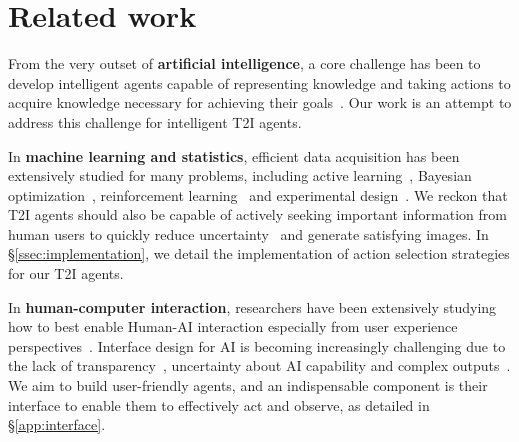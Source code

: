 \section{Related work}
\label{sec:related}

From the very outset of \textbf{artificial intelligence}, a core challenge has been to develop intelligent agents capable of representing knowledge and taking actions to acquire knowledge necessary for achieving their goals~\citep{McCHay69, minsky1974framework, moore1985formal, nilsson2009quest, russell2016artificial}. Our work is an attempt to address this challenge for intelligent T2I agents.%

In \textbf{machine learning and statistics}, efficient data acquisition has been extensively studied for many problems, including active learning~\citep{cohn1996active, settles.tr09, houlsby2011bayesian, gal2017deep, ren2021survey, wang2018active}, Bayesian optimization~\citep{garnett2023bayesian, kushner1964, mockus1974,auer2002b, srinivas2009gaussian, hennig2012, wang2017maxvalue,  wang2024pre}, reinforcement learning~\citep{kaelbling1996reinforcement, ghavamzadeh2015bayesian, sutton2018reinforcement} and experimental design~\citep{ chaloner1995bayesian, kirk2009experimental}. %
We reckon that T2I agents should also be capable of actively seeking important information from human users to quickly reduce uncertainty~\citep{wang2024gaussian} and generate satisfying images. In \S\ref{ssec:implementation}, we detail the implementation of action selection strategies for our T2I agents.



In \textbf{human-computer interaction}, researchers have been extensively studying how to best enable Human-AI interaction especially from user experience perspectives~\citep{norman1994might, hook2000steps, amershi2019guidelines, cai2019human, viegas2023system, chen2024designing, yang2020re, kim2023help}. Interface design for AI is becoming increasingly challenging due to the lack of transparency~\citep{viegas2023system, chen2024designing}, uncertainty about AI capability and complex outputs~\citep{yang2020re}. We aim to build user-friendly agents, and an indispensable component is their interface to enable them to effectively act and observe, as detailed in \S\ref{app:interface}.

